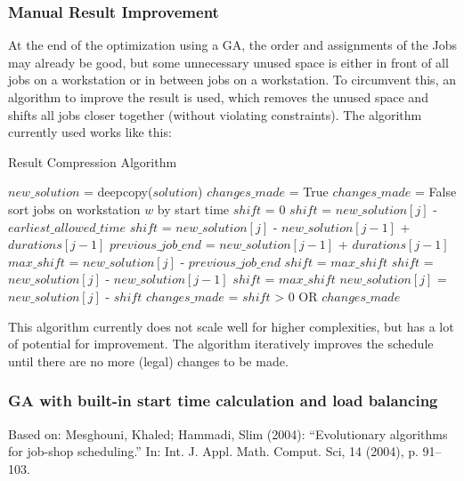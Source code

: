 \documentclass[a4paper,12pt,twoside]{scrreprt}
\begin{document}
\begin{flushleft}
\subsubsection{Manual Result Improvement}
At the end of the optimization using a GA, the order and assignments of the Jobs may already be good, but some unnecessary unused space is either in front of all jobs on a workstation or in between jobs on a workstation. To circumvent this, an algorithm to improve the result is used, which removes the unused space and shifts all jobs closer together (without violating constraints).
The algorithm currently used works like this:
\begin{algorithm}[H]
	\label{Result Compression Algorithm}
	\caption{Result Compression Algorithm}
	\begin{algorithmic}
		\STATE $new\_solution$ = deepcopy($solution$)
		\STATE $changes\_made$ = True
			\STATE $changes\_made$ = False
				\STATE sort jobs on workstation $w$ by start time
						\STATE $shift$ = 0
							\STATE $shift$ = $new\_solution[j]$ - $earliest\_allowed\_time$
						\ELSE
							\STATE $shift$ = $new\_solution[j]$ - $new\_solution[j-1]$ + $durations[j-1]$
						\ENDIF
					\ELSE
						\STATE $previous\_job\_end$ = $new\_solution[j-1]$ + $durations[j-1]$
						\STATE $max\_shift$ = $new\_solution[j]$ - $previous\_job\_end$
							\STATE $shift$ = $max\_shift$
						\ELSE
							\STATE $shift$ = $new\_solution[j]$ - $new\_solution[j-1]$
								\STATE $shift$ = $max\_shift$
							\ENDIF
						\ENDIF
					\ENDIF
					\STATE $new\_solution[j]$ = $new\_solution[j]$ - $shift$
					\STATE $changes\_made$ = $shift$ > 0 OR $changes\_made$
				\ENDFOR
			\ENDFOR
		\ENDWHILE
	\end{algorithmic}
\end{algorithm}
This algorithm currently does not scale well for higher complexities, but has a lot of potential for improvement.
The algorithm iteratively improves the schedule until there are no more (legal) changes to be made.

\subsubsection{GA with built-in start time calculation and load balancing}
Based on: Mesghouni, Khaled; Hammadi, Slim (2004): “Evolutionary algorithms for job-shop scheduling.” In: Int. J. Appl. Math. Comput. Sci, 14 (2004), p. 91–103. 


\end{flushleft}
\end{document}
